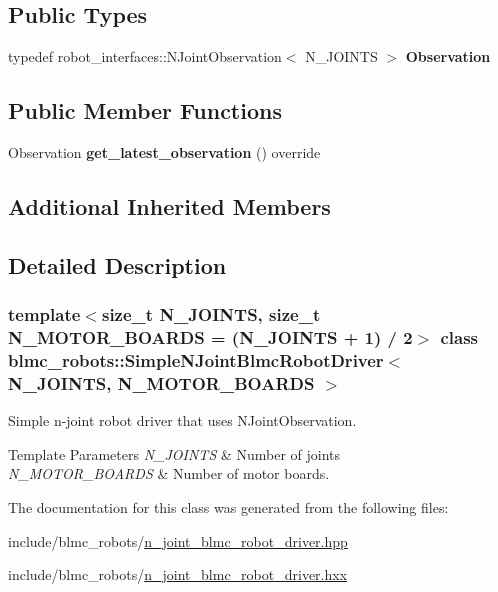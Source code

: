 \subsection*{Public Types}
\begin{DoxyCompactItemize}
\item 
\mbox{\label{classblmc__robots_1_1SimpleNJointBlmcRobotDriver_aa916b4903890975830f4938d08909038}} 
typedef robot\+\_\+interfaces\+::\+N\+Joint\+Observation$<$ N\+\_\+\+J\+O\+I\+N\+TS $>$ {\bfseries Observation}
\end{DoxyCompactItemize}
\subsection*{Public Member Functions}
\begin{DoxyCompactItemize}
\item 
\mbox{\label{classblmc__robots_1_1SimpleNJointBlmcRobotDriver_a47bf814e68498f5344bd81c3d52906bc}} 
Observation {\bfseries get\+\_\+latest\+\_\+observation} () override
\end{DoxyCompactItemize}
\subsection*{Additional Inherited Members}


\subsection{Detailed Description}
\subsubsection*{template$<$size\+\_\+t N\+\_\+\+J\+O\+I\+N\+TS, size\+\_\+t N\+\_\+\+M\+O\+T\+O\+R\+\_\+\+B\+O\+A\+R\+DS = (\+N\+\_\+\+J\+O\+I\+N\+T\+S + 1) / 2$>$\newline
class blmc\+\_\+robots\+::\+Simple\+N\+Joint\+Blmc\+Robot\+Driver$<$ N\+\_\+\+J\+O\+I\+N\+T\+S, N\+\_\+\+M\+O\+T\+O\+R\+\_\+\+B\+O\+A\+R\+D\+S $>$}

Simple n-\/joint robot driver that uses N\+Joint\+Observation. 


\begin{DoxyTemplParams}{Template Parameters}
{\em N\+\_\+\+J\+O\+I\+N\+TS} & Number of joints \\
\hline
{\em N\+\_\+\+M\+O\+T\+O\+R\+\_\+\+B\+O\+A\+R\+DS} & Number of motor boards. \\
\hline
\end{DoxyTemplParams}


The documentation for this class was generated from the following files\+:\begin{DoxyCompactItemize}
\item 
include/blmc\+\_\+robots/\hyperlink{n__joint__blmc__robot__driver_8hpp}{n\+\_\+joint\+\_\+blmc\+\_\+robot\+\_\+driver.\+hpp}\item 
include/blmc\+\_\+robots/\hyperlink{n__joint__blmc__robot__driver_8hxx}{n\+\_\+joint\+\_\+blmc\+\_\+robot\+\_\+driver.\+hxx}\end{DoxyCompactItemize}
